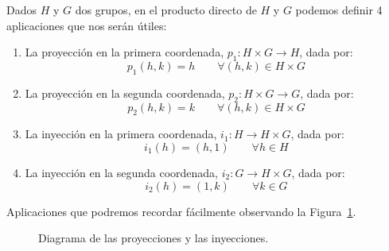\begin{definicion}
    Dados $H$ y $G$ dos grupos, en el producto directo de $H$ y $G$ podemos definir 4 aplicaciones que nos serán útiles:
    \begin{enumerate}
        \item La proyección en la primera coordenada, $p_1:H\times G\to H$, dada por:
            \begin{equation*}
                p_1(h,k) = h \qquad \forall (h,k)\in H\times G
            \end{equation*}
        \item La proyección en la segunda coordenada, $p_2:H\times G\to G$, dada por:
            \begin{equation*}
                p_2(h,k) = k \qquad \forall (h,k)\in H\times G
            \end{equation*}
        \item La inyección en la primera coordenada, $i_1:H\to H\times G$, dada por:
            \begin{equation*}
                i_1(h) = (h,1) \qquad \forall h\in H
            \end{equation*}
        \item La inyección en la segunda coordenada, $i_2:G\to H\times G$, dada por:
            \begin{equation*}
                i_2(h) = (1,k) \qquad \forall k\in G
            \end{equation*}
    \end{enumerate}
    Aplicaciones que podremos recordar fácilmente observando la Figura~\ref{fig:proyecciones_inyecciones}.
    \begin{figure}[H]
        \centering
        \caption{Diagrama de las proyecciones y las inyecciones.}
        \label{fig:proyecciones_inyecciones}
    \end{figure}
\end{definicion}


